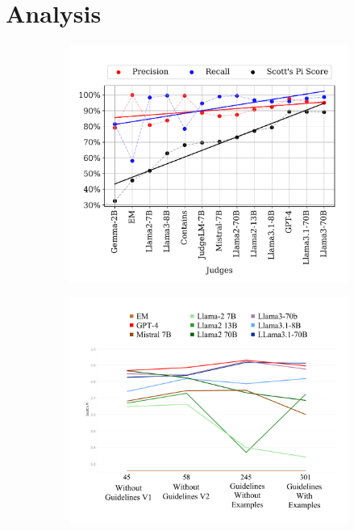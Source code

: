 \section {Analysis}\label{sec:analysis}

\begin{figure}[t]
    \centering
    \begin{subfigure}[b]{0.48\textwidth}
        \centering
        \includegraphics[width=\linewidth]{figures/PrecisionRecall_V6.pdf}
        \vspace{-6mm}
        \caption{}
        \vspace{-2mm}
        \label{fig:precisionrecall}
    \end{subfigure}
    \hfill
    \centering
    \begin{subfigure}[b]{0.51\textwidth}
        \centering
        \includegraphics[width=\linewidth]{figures/TooMuchInfo.pdf}
        \vspace{-6mm}
        \caption{}
        \vspace{-2mm}
        \label{fig:TooMuchInfo}
    \end{subfigure}
    

\end{figure}
